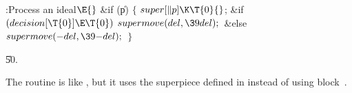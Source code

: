 \B{}:Process an ideal\X${}\E{}$\6
\&{if} (\|p)\5
${}\{{}$\1\6
${}\\{super}[\|p]\K\T{0}{}$;\6
\&{if} ${}(\\{decision}[\T{0}]\E\T{0}){}$\1\5
${}\\{supermove}(\\{del},\39\\{del});{}$\2\6
\&{else}\1\5
${}\\{supermove}({-}\\{del},\39{-}\\{del});{}$\2\6
\4${}\}{}$\2\par
\U50.\fi

The  routine is like , but
it uses the superpiece
defined in  instead of using block~.

